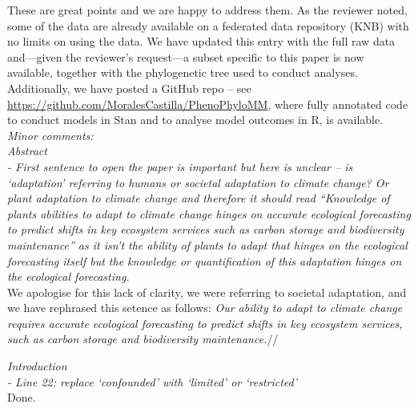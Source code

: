 \documentclass[11pt]{article}
\begin{document}

These are great points and we are happy to address them. As the reviewer noted, some of the data are already available on a federated data repository (KNB) with no limits on using the data. We have updated this entry with the full raw data and---given the reviewer's request---a subset specific to this paper is now available, together with the phylogenetic tree used to conduct analyses. Additionally, we have posted a GitHub repo -- see \url{https://github.com/MoralesCastilla/PhenoPhyloMM}, 
where fully annotated code to conduct models in Stan and to analyse model outcomes in R, is available.\\

\emph{Minor comments:}\\

\emph{Abstract}\\
\emph{- First sentence to open the paper is important but here is unclear – is ‘adaptation’ referring to humans or societal adaptation to climate change? Or plant adaptation to climate change and therefore it should read “Knowledge of plants abilities to adapt to climate change hinges on accurate ecological forecasting to predict shifts in key ecosystem services such as carbon storage and biodiversity maintenance” as it isn’t the ability of plants to adapt that hinges on the ecological forecasting itself but the knowledge or quantification of this adaptation hinges on the ecological forecasting.}\\

We apologise for this lack of clarity, we were referring to societal adaptation, and we have rephrased this setence as follows: \emph{Our ability to adapt to climate change requires accurate ecological forecasting to predict shifts in key ecosystem services, such as carbon storage and biodiversity maintenance.}// %

\emph{Introduction}\\
\emph{- Line 22: replace ‘confounded’ with ‘limited’ or ‘restricted’}\\
Done.\\
\end{document}
